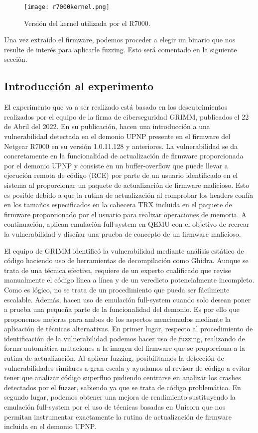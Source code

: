 \begin{figure}[H]
    \centering
    \texttt{[image: r7000kernel.png]}
    \caption{Versión del kernel utilizada por el R7000.}
    \label{fig:R7000kernel}
\end{figure}

Una vez extraído el firmware, podemos proceder a elegir un binario que nos resulte de interés para aplicarle fuzzing. Esto será
comentado en la siguiente sección.

\subsection{Introducción al experimento}
El experimento que va a ser realizado está basado en los descubrimientos realizados por el equipo de la firma de ciberseguridad GRIMM, publicados el
22 de Abril del 2022\cite{r7000GRIMM}. En su publicación, hacen una introducción a una vulnerabilidad detectada en el demonio UPNP presente en 
el firmware del Netgear R7000 en su versión 1.0.11.128 y anteriores. La vulnerabilidad se da concretamente en la funcionalidad de actualización de 
firmware proporcionada por el demonio UPNP y consiste en un buffer-overflow que puede llevar a ejecución remota de código (RCE) por parte de un usuario 
identificado en el sistema al proporcionar un paquete de actualización de firmware malicioso. Esto es posible debido a que la rutina de actualización 
al comprobar los headers confía en los tamaños especificados en la cabecera TRX\cite{firmwareFormat} incluida en el paquete de firmware proporcionado 
por el usuario para realizar operaciones de memoria. A continuación, aplican emulación full-system en QEMU con el objetivo de recrear la vulnerabilidad 
y diseñar una prueba de concepto de un firmware malicioso.\bigskip

El equipo de GRIMM identificó la vulnerabilidad mediante análisis estático de código haciendo uso de herramientas de decompilación como Ghidra\cite{Ghidra}.
Aunque se trata de una técnica efectiva, requiere de un experto cualificado que revise manualmente el código línea a línea y de un veredicto potencialmente 
incompleto. Como es lógico, no se trata de un procedimiento que pueda ser fácilmente escalable. Además, hacen uso de emulación full-system cuando solo desean
poner a prueba una pequeña parte de la funcionalidad del demonio. Es por ello que proponemos mejoras para ambos de los aspectos mencionados mediante la aplicación 
de técnicas alternativas. En primer lugar, respecto al procedimiento de identificación de la vulnerabilidad podemos hacer uso de fuzzing, realizando de forma 
automática mutaciones a la imagen del firmware que se proporciona a la rutina de actualización. Al aplicar fuzzing, posibilitamos la detección de vulnerabilidades 
similares a gran escala y ayudamos al revisor de código a evitar tener que analizar código superfluo pudiendo centrarse en analizar los crashes detectados por
el fuzzer, sabiendo ya que se trata de código problemático. En segundo lugar, podemos obtener una mejora de rendimiento sustituyendo la emulación full-system 
por el uso de técnicas basadas en Unicorn\cite{unicorn} que nos permitan instrumentar exactamente la rutina de actualización de firmware incluida en el 
demonio UPNP.\bigskip

